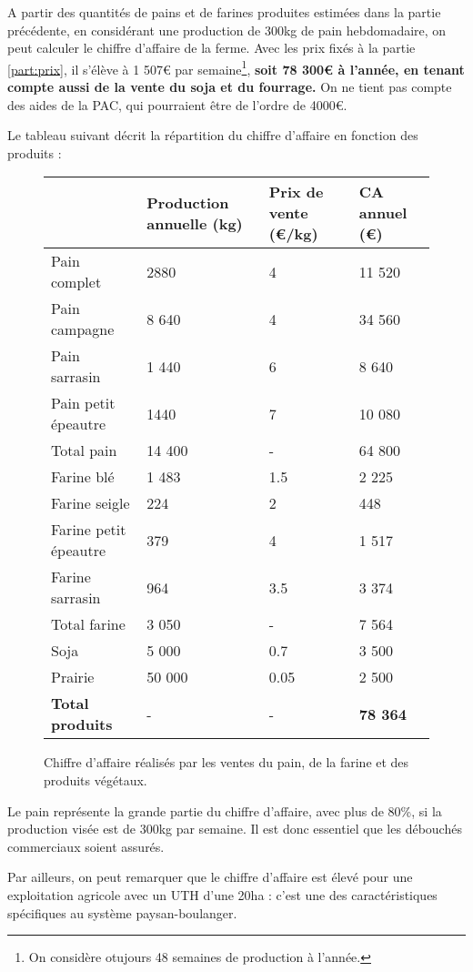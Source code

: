 \documentclass{book}
\begin{document}
A partir des quantités de pains et de farines produites estimées dans la partie précédente, en considérant une production de 300kg de pain hebdomadaire, on peut calculer le chiffre d'affaire de la ferme. Avec les prix fixés à la partie \ref{part:prix}, il s'élève à 1 507\euro{} par semaine\footnote{On considère otujours 48 semaines de production à l'année.}, \textbf{soit 78 300\euro{} à l'année, en tenant compte aussi de la vente du soja et du fourrage.} On ne tient pas compte des aides de la PAC, qui pourraient être de l'ordre de 4000\euro{}.

Le tableau suivant décrit la répartition du chiffre d'affaire en fonction des produits : 
\begin{figure}[h!]
\footnotesize
\center
\begin{tabular}{ | p{3cm} | p{2cm}| p{} |p{2cm}| }
\hline
	& Production annuelle (kg) & Prix de vente (\euro{}/kg) & CA annuel (\euro{})  \\ \hline
	Pain complet & 2880 & 4 & 11 520 \\ 
	Pain campagne & 8 640 & 4 & 34 560 \\ 
	Pain sarrasin & 1 440 & 6 & 8 640 \\
	Pain petit épeautre & 1440 & 7 & 10 080 \\ \hline
	Total pain & 14 400 & - & 64 800 \\ \hline
	\hline
	Farine blé & 1 483 & 1.5 & 2 225 \\
	Farine seigle & 224 & 2 & 448 \\ 
	Farine petit épeautre & 379 & 4 & 1 517 \\ 
	Farine sarrasin & 964 & 3.5 & 3 374 \\ \hline
	Total farine & 3 050 & - & 7 564 \\ \hline
	\hline
	Soja & 5 000 & 0.7 & 3 500 \\ 
	Prairie & 50 000 & 0.05 & 2 500 \\ \hline
	\hline
	\textbf{Total produits} & - & - & \textbf{78 364} \\ \hline
\end{tabular}
\caption{Chiffre d'affaire réalisés par les ventes du pain, de la farine et des produits végétaux.}
\label{tab:CA}
\end{figure}

Le pain représente la grande partie du chiffre d'affaire, avec plus de 80\%, si la production visée est de 300kg par semaine. Il est donc essentiel que les débouchés commerciaux soient assurés. 

Par ailleurs, on peut remarquer que le chiffre d'affaire est élevé pour une exploitation agricole avec un UTH d'une 20ha : c'est une des caractéristiques spécifiques au système paysan-boulanger. 
\end{document}
